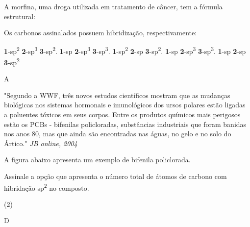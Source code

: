 \documentclass[10pt]{scrartcl}
\begin{document}
\begin{exercise}[points=1]
A morfina, uma droga utilizada em tratamento de câncer, tem a fórmula estrutural:

\begin{center}
\resetchemfig 
{}
\end{center}

Os carbonos assinalados possuem hibridização, respectivamente:

\begin{choice}
\choice \textbf{1}-sp\textsuperscript{2} \textbf{2}-sp\textsuperscript{3} \textbf{3}-sp\textsuperscript{2}.
\choice \textbf{1}-sp   \textbf{2}-sp\textsuperscript{3} \textbf{3}-sp\textsuperscript{3}.
\choice \textbf{1}-sp\textsuperscript{2} \textbf{2}-sp   \textbf{3}-sp\textsuperscript{2}.
\choice \textbf{1}-sp   \textbf{2}-sp\textsuperscript{3} \textbf{3}-sp\textsuperscript{3}.
\choice \textbf{1}-sp   \textbf{2}-sp   \textbf{3}-sp\textsuperscript{2}
\end{choice}
\end{exercise}
\begin{solution}
A
\end{solution}


\begin{exercise}[points=1]
"Segundo a WWF, três novos estudos científicos mostram que as mudanças biológicas nos sistemas hormonais e imunológicos dos ursos polares estão ligadas a poluentes tóxicos em seus corpos. Entre os produtos químicos mais perigosos estão os PCBs - bifenilas policloradas, substâncias industriais que foram banidas nos anos 80, mas que ainda são encontradas nas águas, no gelo e no solo do Ártico."
\emph{JB online, 2004}

A figura abaixo apresenta um exemplo de bifenila policlorada.

\begin{center}
\end{center}

Assinale a opção que apresenta o número total de átomos de carbono com hibridação sp\textsuperscript{2} no composto.

\begin{choice}(2)
\end{choice}
\end{exercise}
\begin{solution}
D
\end{solution}
\end{document}
